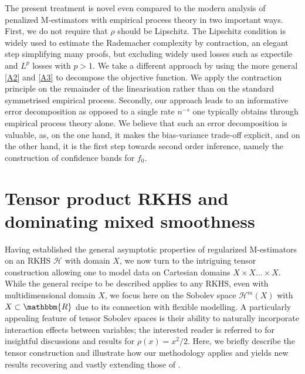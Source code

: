 \documentclass[11pt]{article}
\theoremstyle{definition}
\theoremstyle{remark}
\begin{document}
The present treatment is novel even compared to the modern analysis of penalized M-estimators with empirical process theory  \citep[see, e.g.,][Chapter 12]{VDG:2000} in two important ways. First, we do not require that $\rho$ should be Lipschitz. The Lipschitz condition is widely used to estimate the Rademacher complexity by contraction, an elegant step simplifying many proofs, but excluding widely used losses such as expectile and $L^p$ losses with $p>1$. We take a different approach by using the more general \ref{A2} and \ref{A3} to decompose the objective function. We apply the contraction principle on the remainder of the linearisation rather than on the standard symmetrised empirical process. Secondly, our approach leads to an informative error decomposition as opposed to a single rate $n^{-s}$ one typically obtains through empirical process theory alone. We believe that such an error decomposition is valuable, as, on the one hand, it makes the bias-variance trade-off explicit, and on the other hand, it is the first step towards second order inference, namely the construction of confidence bands for $f_0$. 

\section{Tensor product RKHS and dominating mixed smoothness}
\label{sec:tensor}

Having established the general asymptotic properties of regularized M-estimators on an RKHS $\mathcal{H}$ with domain $X$, we now turn to the intriguing tensor construction allowing one to model data on Cartesian domains $X \times X \ldots \times X$. While the general recipe to be described applies to any RKHS, even with multidimensional domain $X$, we focus here on the Sobolev space $\mathcal{H}^m(X)$ with $X \subset \mathbbm{R}$ due to its connection with flexible modelling. A particularly appealing feature of tensor Sobolev spaces is their ability to naturally incorporate interaction effects between variables; the interested reader is referred to \citep{Lin:2000} for insightful discussions and results for $\rho(x) = x^2/2$. Here, we briefly describe the tensor construction and illustrate how our methodology applies and yields new results recovering and vastly extending those of \citep{Lin:2000}.
\end{document}
